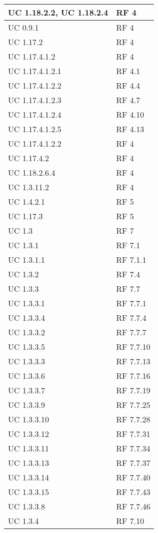 {\begin{longtable} [c]{| p{4cm} | p{4cm} |}
 \hline 
UC 1.18.2.2, UC 1.18.2.4 & RF 4\\ 
 \hline 
UC 0.9.1 & RF 4\\ 
 \hline 
UC 1.17.2 & RF 4\\ 
 \hline 
UC 1.17.4.1.2 & RF 4\\ 
 \hline 
UC 1.17.4.1.2.1 & RF 4.1\\ 
 \hline 
UC 1.17.4.1.2.2 & RF 4.4\\ 
 \hline 
UC 1.17.4.1.2.3 & RF 4.7\\ 
 \hline 
UC 1.17.4.1.2.4 & RF 4.10\\ 
 \hline 
UC 1.17.4.1.2.5 & RF 4.13\\ 
 \hline 
UC 1.17.4.1.2.2 & RF 4\\ 
 \hline 
UC 1.17.4.2 & RF 4\\ 
 \hline 
UC 1.18.2.6.4 & RF 4\\ 
 \hline 
UC 1.3.11.2 & RF 4\\ 
 \hline 
UC 1.4.2.1 & RF 5\\ 
 \hline 
UC 1.17.3 & RF 5\\ 
 \hline 
UC 1.3 & RF 7\\ 
 \hline 
UC 1.3.1 & RF 7.1\\ 
 \hline 
UC 1.3.1.1 & RF 7.1.1\\ 
 \hline 
UC 1.3.2 & RF 7.4\\ 
 \hline 
UC 1.3.3 & RF 7.7\\ 
 \hline 
UC 1.3.3.1 & RF 7.7.1\\ 
 \hline 
UC 1.3.3.4 & RF 7.7.4\\ 
 \hline 
UC 1.3.3.2 & RF 7.7.7\\ 
 \hline 
UC 1.3.3.5 & RF 7.7.10\\ 
 \hline 
UC 1.3.3.3 & RF 7.7.13\\ 
 \hline 
UC 1.3.3.6 & RF 7.7.16\\ 
 \hline 
UC 1.3.3.7 & RF 7.7.19\\ 
 \hline 
UC 1.3.3.9 & RF 7.7.25\\ 
 \hline 
UC 1.3.3.10 & RF 7.7.28\\ 
 \hline 
UC 1.3.3.12 & RF 7.7.31\\ 
 \hline 
UC 1.3.3.11 & RF 7.7.34\\ 
 \hline 
UC 1.3.3.13 & RF 7.7.37\\ 
 \hline 
UC 1.3.3.14 & RF 7.7.40\\ 
 \hline 
UC 1.3.3.15 & RF 7.7.43\\ 
 \hline 
UC 1.3.3.8 & RF 7.7.46\\ 
 \hline 
UC 1.3.4 & RF 7.10\\ 

\end{longtable}}
